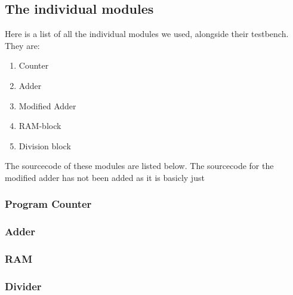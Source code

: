 \documentclass[12pt,a4paper]{article}
\begin{document}
\subsection{The individual modules}
	Here is a list of all the individual modules we used, alongside their testbench. They are:
	\begin{enumerate}
		\item Counter
		\item Adder
		\item Modified Adder
		\item RAM-block
		\item Division block
	\end{enumerate}	
	The sourcecode of these modules are listed below. The sourcecode for the modified adder has not been added as it is basicly just 
	
\subsubsection{Program Counter}
	
\subsubsection{Adder}
	
	\newpage
\subsubsection{RAM}
	
\subsubsection{Divider}
	
\end{document}

